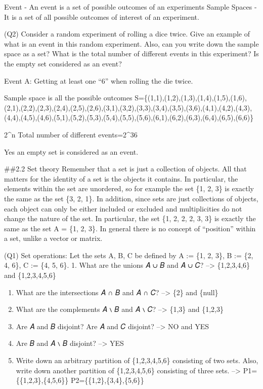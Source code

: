 \documentclass[
]{article}
\begin{document}
Event - An event is a set of possible outcomes of an experiments Sample
Spaces - It is a set of all possible outcomes of interest of an
experiment.

(Q2) Consider a random experiment of rolling a dice twice. Give an
example of what is an event in this random experiment. Also, can you
write down the sample space as a set? What is the total number of
different events in this experiment? Is the empty set considered as an
event?

Event A: Getting at least one ``6'' when rolling the die twice.

Sample space is all the possible outcomes
S=\{(1,1),(1,2),(1,3),(1,4),(1,5),(1,6),(2,1),(2,2),(2,3),(2,4),(2,5),(2,6),(3,1),(3,2),(3,3),(3,4),(3,5),(3,6),(4,1),(4,2),(4,3),(4,4),(4,5),(4,6),(5,1),(5,2),(5,3),(5,4),(5,5),(5,6),(6,1),(6,2),(6,3),(6,4),(6,5),(6,6)\}

2\^{}n Total number of different events=2\^{}36

Yes an empty set is considered as an event.

\#\#2.2 Set theory Remember that a set is just a collection of objects.
All that matters for the identity of a set is the objects it contains.
In particular, the elements within the set are unordered, so for example
the set \{1, 2, 3\} is exactly the same as the set \{3, 2, 1\}. In
addition, since sets are just collections of objects, each object can
only be either included or excluded and multiplicities do not change the
nature of the set. In particular, the set \{1, 2, 2, 2, 3, 3\} is
exactly the same as the set A = \{1, 2, 3\}. In general there is no
concept of ``position'' within a set, unlike a vector or matrix.

(Q1) Set operations: Let the sets A, B, C be defined by A := \{1, 2,
3\}, B := \{2, 4, 6\}, C := \{4, 5, 6\}. 1. What are the unions 𝐴 ∪ 𝐵
and 𝐴 ∪ 𝐶? --\textgreater{} \{1,2,3,4,6\} and \{1,2,3,4,5,6\}

\begin{enumerate}
\def\labelenumi{\arabic{enumi}.}
\setcounter{enumi}{1}
\item
  What are the intersections 𝐴 ∩ 𝐵 and 𝐴 ∩ 𝐶? --\textgreater{} \{2\} and
  \{null\}
\item
  What are the complements 𝐴 ∖ 𝐵 and 𝐴 ∖ 𝐶? --\textgreater{} \{1,3\} and
  \{1,2,3\}
\item
  Are 𝐴 and 𝐵 disjoint? Are 𝐴 and 𝐶 disjoint? --\textgreater{} NO and
  YES
\item
  Are 𝐵 and 𝐴 ∖ 𝐵 disjoint? --\textgreater{} YES
\item
  Write down an arbitrary partition of \{1,2,3,4,5,6\} consisting of two
  sets. Also, write down another partition of \{1,2,3,4,5,6\} consisting
  of three sets. --\textgreater{} P1=\{\{1,2,3\},\{4,5,6\}\}
  P2=\{\{1,2\},\{3,4\},\{5,6\}\}
\end{enumerate}
\end{document}
